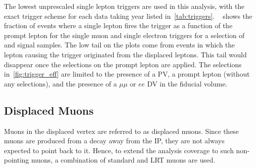 The lowest unprescaled single lepton triggers are used in this analysis, with the exact trigger scheme for each data taking year listed in~\cref{tab:triggers}. ~ shows the fraction of events where a single lepton fires the trigger as a function of the prompt lepton \pT for the single muon and single electron triggers for a selection of \uuu and \eee signal samples. The low \pT tail on the plots come from events in which the lepton causing the trigger originated from the displaced leptons. This tail would disappear once the selections on the prompt lepton are applied. The selections in~\cref{fig:trigger_eff} are limited to the presence of a PV, a prompt lepton (without any selections), and the presence of a $\mu\mu$ or $ee$ DV in the fiducial volume.

\subsection{Displaced Muons}
Muons in the displaced vertex are referred to as displaced muons. Since these muons are produced from a decay away from the IP, they are not always expected to point back to it. Hence, to extend the analysis coverage to such non-pointing muons, a combination of standard and LRT muons are used.

